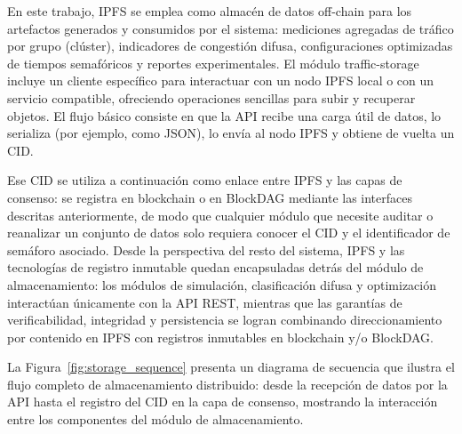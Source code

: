 En este trabajo, IPFS se emplea como almacén de datos off-chain para los artefactos generados y consumidos por el sistema: mediciones agregadas de tráfico por grupo (clúster), indicadores de congestión difusa, configuraciones optimizadas de tiempos semafóricos y reportes experimentales. El módulo traffic-storage incluye un cliente específico para interactuar con un nodo IPFS local o con un servicio compatible, ofreciendo operaciones sencillas para subir y recuperar objetos. El flujo básico consiste en que la API recibe una carga útil de datos, lo serializa (por ejemplo, como JSON), lo envía al nodo IPFS y obtiene de vuelta un CID.

Ese CID se utiliza a continuación como enlace entre IPFS y las capas de consenso: se registra en blockchain o en BlockDAG mediante las interfaces descritas anteriormente, de modo que cualquier módulo que necesite auditar o reanalizar un conjunto de datos solo requiera conocer el CID y el identificador de semáforo asociado. Desde la perspectiva del resto del sistema, IPFS y las tecnologías de registro inmutable quedan encapsuladas detrás del módulo de almacenamiento: los módulos de simulación, clasificación difusa y optimización interactúan únicamente con la API REST, mientras que las garantías de verificabilidad, integridad y persistencia se logran combinando direccionamiento por contenido en IPFS con registros inmutables en blockchain y/o BlockDAG.

La Figura~\ref{fig:storage_sequence} presenta un diagrama de secuencia que ilustra el flujo completo de almacenamiento distribuido: desde la recepción de datos por la API hasta el registro del CID en la capa de consenso, mostrando la interacción entre los componentes del módulo de almacenamiento.

